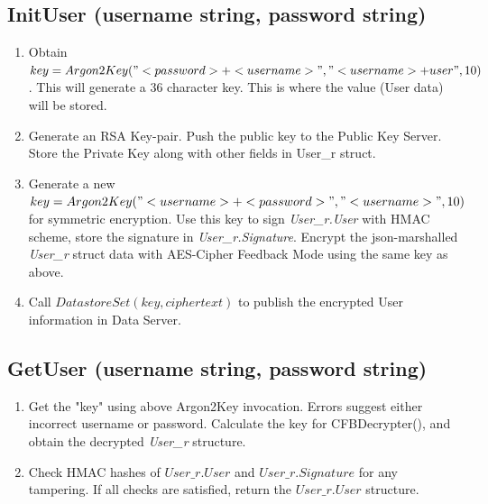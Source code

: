 \documentclass[a4paper, 12pt]{scrartcl}
\begin{document}
\subsection{InitUser (username string, password string)}
\begin{enumerate}
	\itemsep0em

	\item Obtain $key = Argon2Key("<password>+<username>", "<username>+user", 10)$. This will generate a 36 character key. This is where the value (User data) will be stored.
	\item Generate an RSA Key-pair. Push the public key to the Public Key Server. Store the Private Key along with other fields in User\_r struct.
	\item Generate a new $key = Argon2Key("<username>+<password>", "<username>", 10)$ for symmetric encryption. Use this key to sign \textit{User\_r.User} with HMAC scheme, store the signature in \textit{User\_r.Signature}. Encrypt the json-marshalled \textit{User\_r} struct data with AES-Cipher Feedback Mode using the same key as above.
	\item Call $DatastoreSet(key, ciphertext)$ to publish the encrypted User information in Data Server.
\end{enumerate}

\subsection{GetUser (username string, password string)}
\begin{enumerate}
	\itemsep0em

	\item Get the "key" using above Argon2Key invocation. Errors suggest either incorrect username or password. Calculate the key for CFBDecrypter(), and obtain the decrypted \textit{User\_r} structure.
	\item Check HMAC hashes of $User\_r.User$ and $User\_r.Signature$ for any tampering. If all checks are satisfied, return the $User\_r.User$ structure.
\end{enumerate}
\end{document}
